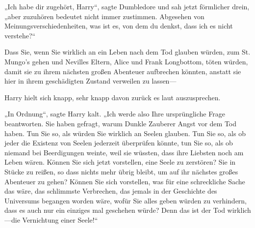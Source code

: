 „Ich habe dir zugehört, Harry“, sagte Dumbledore und sah jetzt förmlicher drein, „aber zuzuhören bedeutet nicht immer zustimmen. Abgesehen von Meinungsverschiedenheiten, was ist es, von dem du denkst, dass ich es nicht verstehe?“

Dass Sie, wenn Sie wirklich an ein Leben nach dem Tod glauben würden, zum St. Mungo's gehen und Nevilles Eltern, Alice und Frank Longbottom, töten würden, damit sie zu ihrem nächsten großen Abenteuer aufbrechen könnten, anstatt sie hier in ihrem geschädigten Zustand verweilen zu lassen—

Harry hielt sich knapp, sehr knapp davon zurück es laut auszusprechen.

„In Ordnung“, sagte Harry kalt. „Ich werde also Ihre ursprüngliche Frage beantworten. Sie haben gefragt, warum Dunkle Zauberer Angst vor dem Tod haben. Tun Sie so, als würden Sie wirklich an Seelen glauben. Tun Sie so, als ob jeder die Existenz von Seelen jederzeit überprüfen könnte, tun Sie so, als ob niemand bei Beerdigungen weinte, weil sie wüssten, dass ihre Liebsten noch am Leben wären. Können Sie sich jetzt vorstellen, eine Seele zu zerstören? Sie in Stücke zu reißen, so dass nichts mehr übrig bleibt, um auf ihr nächstes großes Abenteuer zu gehen? Können Sie sich vorstellen, was für eine schreckliche Sache das wäre, das schlimmste Verbrechen, das jemals in der Geschichte des Universums begangen worden wäre, wofür Sie alles geben würden zu verhindern, dass es auch nur ein einziges mal geschehen würde? Denn das ist der Tod wirklich—die Vernichtung einer Seele!“

